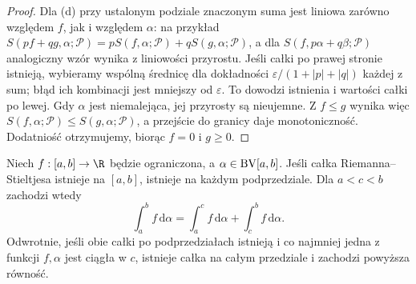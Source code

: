 \begin{proof}
Dla (d) przy ustalonym podziale znaczonym suma jest liniowa zarówno względem $f$, jak i względem $\alpha$: na przykład
$S(pf+qg,\alpha;\mathcal P)=pS(f,\alpha;\mathcal P)+qS(g,\alpha;\mathcal P)$, a dla $S(f,p\alpha+q\beta;\mathcal P)$ analogiczny wzór wynika z liniowości przyrostu. Jeśli całki po prawej stronie istnieją, wybieramy wspólną średnicę dla dokładności $\varepsilon/(1+|p|+|q|)$ każdej z sum; błąd ich kombinacji jest mniejszy od $\varepsilon$. To dowodzi istnienia i wartości całki po lewej. Gdy $\alpha$ jest niemalejąca, jej przyrosty są nieujemne. Z $f\le g$ wynika więc $S(f,\alpha;\mathcal P)\le S(g,\alpha;\mathcal P)$, a przejście do granicy daje monotoniczność. Dodatniość otrzymujemy, biorąc $f=0$ i $g\ge0$.
\end{proof}
\begin{twierdzenie}\label{it:thm:rs-locality}
Niech $f:[a,b]\to\R$ będzie ograniczona, a $\alpha\in\mathrm{BV}[a,b]$. Jeśli całka Riemanna--Stieltjesa istnieje na $[a,b]$, istnieje na każdym podprzedziale. Dla $a<c<b$ zachodzi wtedy
\[
 \int_a^b f\,\mathrm d\alpha
 =\int_a^c f\,\mathrm d\alpha+\int_c^b f\,\mathrm d\alpha.
\]
Odwrotnie, jeśli obie całki po podprzedziałach istnieją i co najmniej jedna z funkcji $f,\alpha$ jest ciągła w $c$, istnieje całka na całym przedziale i zachodzi powyższa równość.
\end{twierdzenie}
